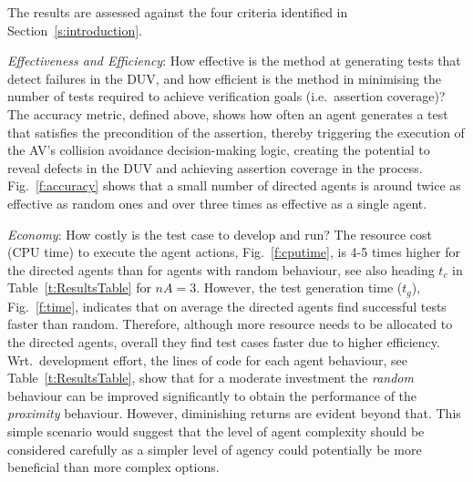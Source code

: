 \documentclass[letterpaper, 10 pt, journal, twoside]{IEEEtran}
\begin{document}

The results are assessed against the four criteria identified in Section~\ref{s:introduction}.

\textit{Effectiveness and Efficiency}: How effective is the method at generating tests that detect failures in the DUV, and how efficient is the method in minimising the number of tests required to achieve verification goals (i.e.\ assertion coverage)?
%
The accuracy metric, defined above, shows how often an agent generates a test that satisfies the precondition of the assertion, thereby triggering the execution of the AV's collision avoidance decision-making logic, creating the potential to reveal defects in the DUV and achieving assertion coverage in the process. 
%
Fig.~\ref{f:accuracy} shows that a small number of directed agents is around twice as effective as random ones and over three times as effective as a single agent.


\textit{Economy}: How costly is the test case to develop and run? %
The resource cost (CPU time) to execute the agent actions, Fig.~\ref{f:cputime}, is 4-5 times higher for the directed agents than for agents with random behaviour, see also heading $t_{c}$ in Table~\ref{t:ResultsTable} for $nA=3$. %
	However, the test generation time ($t_g$), Fig.~\ref{f:time}, indicates that on average the directed agents find successful tests faster than random. Therefore, although more resource needs to be  allocated to the directed agents, overall they find test cases faster due to higher efficiency. %
%	
Wrt.\ development effort, the lines of code for each agent behaviour, see Table~\ref{t:ResultsTable}, show that for a moderate investment the \textit{random} behaviour can be improved significantly to obtain the performance of the \textit{proximity} behaviour. However, diminishing returns are evident beyond that. 
%
%
This simple scenario would suggest that the level of agent complexity should be considered carefully as a simpler level of agency could potentially be more beneficial than more complex options. 
\end{document}
